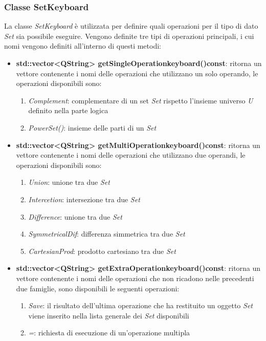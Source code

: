 \documentclass[a4paper,10pt]{article}
\begin{document}
    \subsubsection{Classe SetKeyboard}
    La classe \textit{SetKeyboard} è utilizzata per definire quali operazioni per il tipo di dato \textit{Set} sia possibile eseguire.
    Vengono definite tre tipi di operazioni principali, i cui nomi vengono definiti all'interno di questi metodi:
    \begin{itemize}
        \item \textbf{std::vector<QString> getSingleOperationkeyboard()const}: ritorna un vettore contenente i nomi delle operazioni che utilizzano un solo operando, le operazioni disponibili sono:
        \begin{enumerate}
            \item \textit{Complement}: complementare di  un set \textit{Set} rispetto l'insieme universo \textit{U} definito nella parte logica
            \item \textit{PowerSet()}: insieme delle parti di un \textit{Set}
        \end{enumerate}
        \item \textbf{std::vector<QString> getMultiOperationkeyboard()const}: ritorna un vettore contenente i nomi delle operazioni che utilizzano due operandi, le operazioni disponibili sono:
        \begin{enumerate}
            \item \textit{Union}: unione tra due \textit{Set}
            \item \textit{Intercetion}: intersezione tra due \textit{Set}
            \item \textit{Difference}: unione tra due \textit{Set}
            \item \textit{SymmetricalDif}: differenza simmetrica tra due \textit{Set}
            \item \textit{CartesianProd}: prodotto cartesiano tra due \textit{Set}
        \end{enumerate}
        \item \textbf{std::vector<QString> getExtraOperationkeyboard()const}: ritorna un vettore contenente i nomi delle operazioni che non ricadono nelle precedenti due famiglie, sono disponibili le seguenti operazioni:
        \begin{enumerate}
            \item \textit{Save}: il risultato dell'ultima operazione che ha restituito un oggetto \textit{Set} viene inserito nella lista generale dei \textit{Set} disponibili
            \item \textit{=}: richiesta di esecuzione di un'operazione multipla
        \end{enumerate}
    \end{itemize}
\end{document}
